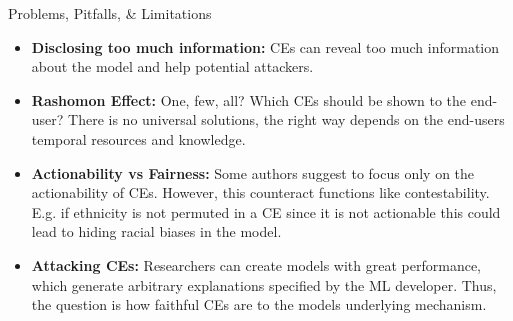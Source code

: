 \documentclass[11pt,compress,t,notes=noshow, xcolor=table]{beamer}
\begin{document}
\begin{vbframe}{Problems, Pitfalls, \& Limitations}
\begin{itemize}
    \framebreak
    \item \textbf{Disclosing too much information:} CEs can reveal too much information about the model and help potential attackers.
    \item \textbf{Rashomon Effect:} One, few, all? Which CEs should be shown to the end-user? There is no universal solutions, the right way depends on the end-users temporal resources and knowledge. 
    \item \textbf{Actionability vs Fairness:} Some authors suggest to focus only on the actionability of CEs. However, this counteract functions like contestability. E.g. if ethnicity is not permuted in a CE since it is not actionable this could lead to hiding racial biases in the model.
    \item \textbf{Attacking CEs:} Researchers can create models with great performance, which generate arbitrary explanations specified by the ML developer. Thus, the question is how faithful CEs are to the models underlying mechanism.
\end{itemize}
\end{vbframe}
\endlecture
\end{document}
